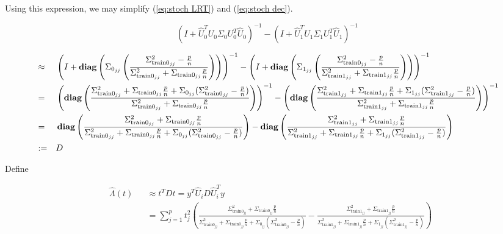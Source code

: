 \documentclass[english]{article}
\begin{document}
Using this expression, we may simplify (\ref{eq:stoch LRT}) and (\ref{eq:stoch dec}).

\begin{equation}
\left(I+\hat{U}_0^TU_0\Sigma_0U_0^T\hat{U}_0\right)^{-1}-\left(I+\hat{U}_1^TU_1\Sigma_1U_1^T\hat{U}_1\right)^{-1}
\end{equation}

\begin{equation}
\begin{aligned}
& \approx
&&\left(I+\mathop{\bf diag}\left(\Sigma_{0_{jj}}\left(\frac{\Sigma_{\text{train}0_{jj}}^2-\frac{p}{n}}{\Sigma_{\text{train}0_{jj}}^2+\Sigma_{\text{train}0_{jj}}\frac{p}{n}}\right)\right)\right)^{-1}-\left(I+\mathop{\bf diag}\left(\Sigma_{1_{jj}}\left(\frac{\Sigma_{\text{train}0_{jj}}^2-\frac{p}{n}}{\Sigma_{\text{train}1_{jj}}^2+\Sigma_{\text{train}1_{jj}}\frac{p}{n}}\right)\right)\right)^{-1}\\
&=
&&\left(\mathop{\bf diag}\left(\frac{\Sigma_{\text{train}0_{jj}}^2+\Sigma_{\text{train}0_{jj}}\frac{p}{n} + \Sigma_{0_{jj}}(\Sigma_{\text{train}0_{jj}}^2 - \frac{p}{n})}{\Sigma_{\text{train}0_{jj}}^2+\Sigma_{\text{train}0_{jj}}\frac{p}{n}}\right)\right)^{-1} - \left(\mathop{\bf diag}\left(\frac{\Sigma_{\text{train}1_{jj}}^2+\Sigma_{\text{train}1_{jj}}\frac{p}{n} + \Sigma_{1_{jj}}(\Sigma_{\text{train}1_{jj}}^2 - \frac{p}{n})}{\Sigma_{\text{train}1_{jj}}^2+\Sigma_{\text{train}1_{jj}}\frac{p}{n}}\right)\right)^{-1}\\
&=
&&\mathop{\bf diag}\left(\frac{\Sigma_{\text{train}0_{jj}}^2+\Sigma_{\text{train}0_{jj}}\frac{p}{n}}{\Sigma_{\text{train}0_{jj}}^2+\Sigma_{\text{train}0_{jj}}\frac{p}{n} + \Sigma_{0_{jj}}(\Sigma_{\text{train}0_{jj}}^2 - \frac{p}{n})}\right) - \mathop{\bf diag}\left(\frac{\Sigma_{\text{train}1_{jj}}^2+\Sigma_{\text{train}1_{jj}}\frac{p}{n}}{\Sigma_{\text{train}1_{jj}}^2+\Sigma_{\text{train}1_{jj}}\frac{p}{n} + \Sigma_{1_{jj}}(\Sigma_{\text{train}1_{jj}}^2 - \frac{p}{n})}\right)\\
&:=
&&D
\end{aligned}
\end{equation}

Define

\begin{equation}
\begin{aligned}
&\hat{\Lambda}(t) 
&&\approx t^TDt=y^T\hat{U}_iD\hat{U}_i^Ty\\
&&&=\sum_{j=1}^pt_j^2\left(\frac{\Sigma_{\text{train}0_{jj}}^2+\Sigma_{\text{train}0_{jj}}\frac{p}{n}}{\Sigma_{\text{train}0_{jj}}^2+\Sigma_{\text{train}0_{jj}}\frac{p}{n} + \Sigma_{0_{jj}}(\Sigma_{\text{train}0_{jj}}^2 - \frac{p}{n})}-\frac{\Sigma_{\text{train}1_{jj}}^2+\Sigma_{\text{train}1_{jj}}\frac{p}{n}}{\Sigma_{\text{train}1_{jj}}^2+\Sigma_{\text{train}1_{jj}}\frac{p}{n} + \Sigma_{1_{jj}}(\Sigma_{\text{train}1_{jj}}^2 - \frac{p}{n})}\right)
\end{aligned}
\end{equation}
\end{document}
